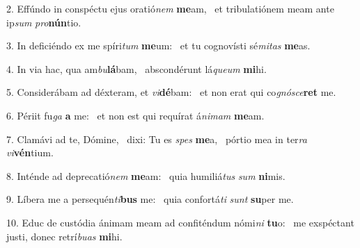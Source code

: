 2. Effúndo in conspéctu ejus oratió\textit{nem} \textbf{me}am, \ast\  et tribulatiónem meam ante ip\textit{sum} \textit{pro}\textbf{nún}tio.\

3. In deficiéndo ex me spíri\textit{tum} \textbf{me}um: \ast\  et tu cognovísti sé\textit{mi}\textit{tas} \textbf{me}as.\

4. In via hac, qua am\textit{bu}\textbf{lá}bam, \ast\  abscondérunt lá\textit{que}\textit{um} \textbf{mi}hi.\

5. Considerábam ad déxteram, et \textit{vi}\textbf{dé}bam: \ast\  et non erat qui co\textit{gnó}\textit{sce}\textbf{ret} me.\

6. Périit fu\textit{ga} \textbf{a} me: \ast\  et non est qui requírat á\textit{ni}\textit{mam} \textbf{me}am.\

7. Clamávi ad te, Dómine, \dag\  dixi: Tu es \textit{spes} \textbf{me}a, \ast\  pórtio mea in ter\textit{ra} \textit{vi}\textbf{vén}tium.\

8. Inténde ad deprecatió\textit{nem} \textbf{me}am: \ast\  quia humiliá\textit{tus} \textit{sum} \textbf{ni}mis.\

9. Líbera me a persequén\textit{ti}\textbf{bus} me: \ast\  quia confortá\textit{ti} \textit{sunt} \textbf{su}per me.\

10. Educ de custódia ánimam meam ad confiténdum nómi\textit{ni} \textbf{tu}o: \ast\  me exspéctant justi, donec retrí\textit{bu}\textit{as} \textbf{mi}hi.\

